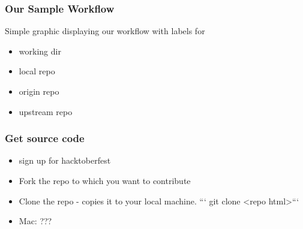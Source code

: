 \documentclass[unknownkeysallowed]{beamer}
\begin{document}
\begin{frame}
    \frametitle{Our Sample Workflow}
    Simple graphic displaying our workflow with labels for
    \begin{itemize}
        \item{working dir}
        \item{local repo}
        \item{origin repo}
        \item{upstream repo}
    \end{itemize}
    \vspace{1cm} %
\end{frame}

\begin{frame}
    \frametitle{Get source code}
    \begin{itemize}
        \item{sign up for hacktoberfest}
        \item{Fork the repo to which you want to contribute}
        \item{Clone the repo - copies it to your local machine.  ``` git clone <repo html>```}
        \item{Mac: ???}
    \end{itemize}
    \vspace{1cm} %
\end{frame}
\end{document}
